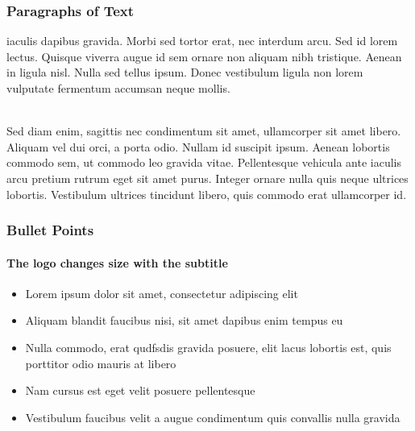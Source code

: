 \documentclass{beamer}
\begin{document}
\begin{frame}
\frametitle{Paragraphs of Text}
{iaculis dapibus gravida. Morbi sed tortor erat, nec interdum arcu. Sed id lorem lectus. Quisque viverra augue id sem ornare non aliquam nibh tristique. Aenean in ligula nisl. Nulla sed tellus ipsum. Donec vestibulum ligula non lorem vulputate fermentum accumsan neque mollis.\\~\\}

Sed diam enim, sagittis nec condimentum sit amet, ullamcorper sit amet libero. Aliquam vel dui orci, a porta odio. Nullam id suscipit ipsum. Aenean lobortis commodo sem, ut commodo leo gravida vitae. Pellentesque vehicula ante iaculis arcu pretium rutrum eget sit amet purus. Integer ornare nulla quis neque ultrices lobortis. Vestibulum ultrices tincidunt libero, quis commodo erat ullamcorper id.
\end{frame}


\begin{frame}
\frametitle{Bullet Points}
\framesubtitle{The logo changes size with the subtitle}
\begin{itemize}
\item Lorem ipsum dolor sit amet, consectetur adipiscing elit
\item Aliquam blandit faucibus nisi, sit amet dapibus enim tempus eu
\item Nulla commodo, erat qudfsdis gravida posuere, elit lacus lobortis est, quis porttitor odio mauris at libero
\item Nam cursus est eget velit posuere pellentesque
\item Vestibulum faucibus velit a augue condimentum quis convallis nulla gravida
\end{itemize}
\end{frame}

\end{document}
